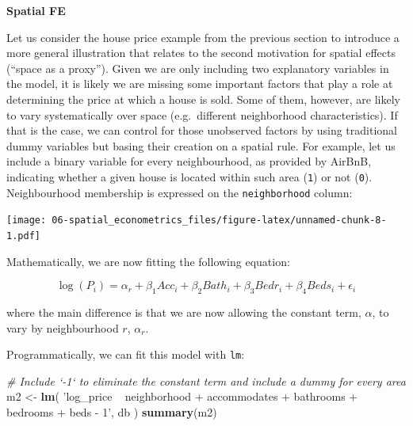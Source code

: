 \documentclass[
]{book}
\newenvironment{Shaded}{\begin{snugshade}}{\end{snugshade}}
\newcommand{\CommentTok}[1]{\textcolor[rgb]{0.56,0.35,0.01}{\textit{#1}}}
\newcommand{\DataTypeTok}[1]{\textcolor[rgb]{0.13,0.29,0.53}{#1}}
\newcommand{\KeywordTok}[1]{\textcolor[rgb]{0.13,0.29,0.53}{\textbf{#1}}}
\newcommand{\NormalTok}[1]{#1}
\newcommand{\OperatorTok}[1]{\textcolor[rgb]{0.81,0.36,0.00}{\textbf{#1}}}
\newcommand{\StringTok}[1]{\textcolor[rgb]{0.31,0.60,0.02}{#1}}
\begin{document}
\textbf{Spatial FE}

Let us consider the house price example from the previous section to introduce a more general illustration that relates to the second motivation for spatial effects (``space as a proxy''). Given we are only including two explanatory variables in the model, it is likely we are missing some important factors that play a role at determining the price at which a house is sold. Some of them, however, are likely to vary systematically over space (e.g.~different neighborhood characteristics). If that is the case, we can control for those unobserved factors by using traditional dummy variables but basing their creation on a spatial rule. For example, let us include a binary variable for every neighbourhood, as provided by AirBnB, indicating whether a given house is located within such area (\texttt{1}) or not (\texttt{0}). Neighbourhood membership is expressed on the \texttt{neighborhood} column:

\begin{Shaded}
\end{Shaded}

\texttt{[image: 06-spatial\_econometrics\_files/figure-latex/unnamed-chunk-8-1.pdf]}

Mathematically, we are now fitting the following equation:

\[
\log(P_i) = \alpha_r + \beta_1 Acc_i + \beta_2 Bath_i + \beta_3 Bedr_i + \beta_4 Beds_i + \epsilon_i
\]

where the main difference is that we are now allowing the constant term, \(\alpha\), to vary by neighbourhood \(r\), \(\alpha_r\).

Programmatically, we can fit this model with \texttt{lm}:

\begin{Shaded}
\begin{Highlighting}[]
\CommentTok{# Include `-1` to eliminate the constant term and include a dummy for every area}
\NormalTok{m2 <-}\StringTok{ }\KeywordTok{lm}\NormalTok{(}
  \StringTok{'log_price ~ neighborhood + accommodates + bathrooms + bedrooms + beds - 1'}\NormalTok{, }
\NormalTok{  db}
\NormalTok{)}
\KeywordTok{summary}\NormalTok{(m2)}
\end{Highlighting}
\end{Shaded}
\end{document}
